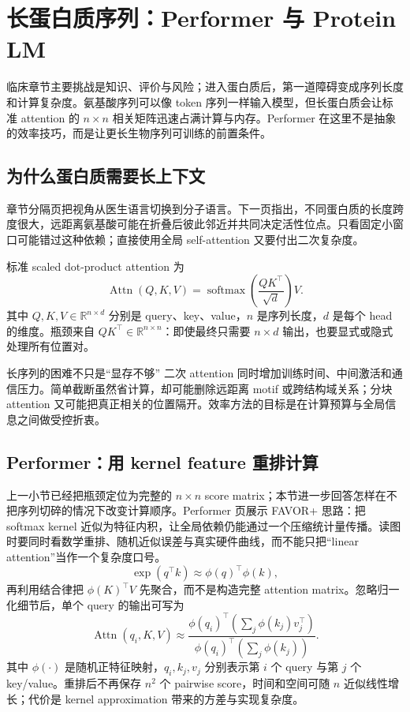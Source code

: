\section{长蛋白质序列：Performer 与 Protein LM}

临床章节主要挑战是知识、评价与风险；进入蛋白质后，第一道障碍变成序列长度和计算复杂度。氨基酸序列可以像 token 序列一样输入模型，但长蛋白质会让标准 attention 的 $n\times n$ 相关矩阵迅速占满计算与内存。Performer 在这里不是抽象的效率技巧，而是让更长生物序列可训练的前置条件。

\subsection{为什么蛋白质需要长上下文}

章节分隔页把视角从医生语言切换到分子语言。下一页指出，不同蛋白质的长度跨度很大，远距离氨基酸可能在折叠后彼此邻近并共同决定活性位点。只看固定小窗口可能错过这种依赖；直接使用全局 self-attention 又要付出二次复杂度。



标准 scaled dot-product attention 为
$$
\operatorname{Attn}(Q,K,V)=
\operatorname{softmax}\!\left(\frac{QK^{\top}}{\sqrt d}\right)V.
$$
其中 $Q,K,V\in\mathbb{R}^{n\times d}$ 分别是 query、key、value，$n$ 是序列长度，$d$ 是每个 head 的维度。瓶颈来自 $QK^{\top}\in\mathbb{R}^{n\times n}$：即使最终只需要 $n\times d$ 输出，也要显式或隐式处理所有位置对。

\begin{warningbox}{长序列的困难不只是“显存不够”}
二次 attention 同时增加训练时间、中间激活和通信压力。简单截断虽然省计算，却可能删除远距离 motif 或跨结构域关系；分块 attention 又可能把真正相关的位置隔开。效率方法的目标是在计算预算与全局信息之间做受控折衷。
\end{warningbox}

\subsection{Performer：用 kernel feature 重排计算}

上一小节已经把瓶颈定位为完整的 $n\times n$ score matrix；本节进一步回答怎样在不把序列切碎的情况下改变计算顺序。Performer 页展示 FAVOR+ 思路：把 softmax kernel 近似为特征内积，让全局依赖仍能通过一个压缩统计量传播。读图时要同时看数学重排、随机近似误差与真实硬件曲线，而不能只把“linear attention”当作一个复杂度口号。
$$
\exp(q^{\top}k)\approx \phi(q)^{\top}\phi(k),
$$
再利用结合律把 $\phi(K)^{\top}V$ 先聚合，而不是构造完整 attention matrix。忽略归一化细节后，单个 query 的输出可写为
$$
\operatorname{Attn}(q_i,K,V)\approx
\frac{\phi(q_i)^{\top}\left(\sum_j \phi(k_j)v_j^{\top}\right)}
{\phi(q_i)^{\top}\left(\sum_j \phi(k_j)\right)}.
$$
其中 $\phi(\cdot)$ 是随机正特征映射，$q_i,k_j,v_j$ 分别表示第 $i$ 个 query 与第 $j$ 个 key/value。重排后不再保存 $n^2$ 个 pairwise score，时间和空间可随 $n$ 近似线性增长；代价是 kernel approximation 带来的方差与实现复杂度。


